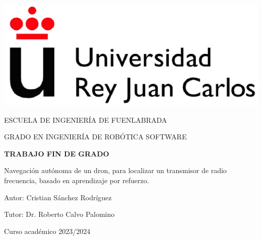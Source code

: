 \thispagestyle{empty}

\begin{titlepage}
	\begin{center}
		\vspace*{3mm}
		\begin{center}
			\includegraphics[width=0.4\linewidth]{imagenes/cap1/logo_urjc}
		\end{center}
		\vspace{6.0mm}
		
		\fontsize{15.5}{14}\selectfont ESCUELA DE INGENIERÍA DE FUENLABRADA
		\vspace{13mm}
		
		\fontsize{14}{14}\selectfont GRADO EN INGENIERÍA DE ROBÓTICA SOFTWARE
		
		\vspace{70pt}
		
		\fontsize{15.7}{14}\selectfont \textbf{TRABAJO FIN DE GRADO} 
		
		\vspace{20mm}
		\begin{LARGE}
			Navegación autónoma de un dron, para localizar un transmisor de radio frecuencia, basado en aprendizaje por refuerzo.
		\end{LARGE}
		
		\vspace{20mm}
		
		\begin{large}
			Autor: Cristian Sánchez Rodríguez
			
			Tutor: Dr. Roberto Calvo Palomino
			
			\vspace{10mm}
		\end{large}
		\begin{normalsize}
			Curso académico 2023/2024		
		\end{normalsize}
		\vspace{10mm}
		
	\end{center}
	
\end{titlepage}

\thispagestyle{empty}
